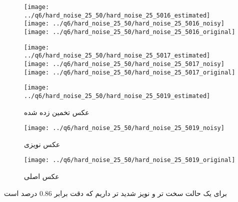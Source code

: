 \documentclass[a4paper,12pt]{article}
\begin{document}
\begin{figure}[!htb]
  \texttt{[image: ../q6/hard\_noise\_25\_50/hard\_noise\_25\_5016\_estimated]}
\endminipage\hfill
{}
  \texttt{[image: ../q6/hard\_noise\_25\_50/hard\_noise\_25\_5016\_noisy]}
\endminipage\hfill
{}
  \texttt{[image: ../q6/hard\_noise\_25\_50/hard\_noise\_25\_5016\_original]}
\endminipage\hfill

  \texttt{[image: ../q6/hard\_noise\_25\_50/hard\_noise\_25\_5017\_estimated]}
\endminipage\hfill
{}
  \texttt{[image: ../q6/hard\_noise\_25\_50/hard\_noise\_25\_5017\_noisy]}
\endminipage\hfill
{}
  \texttt{[image: ../q6/hard\_noise\_25\_50/hard\_noise\_25\_5017\_original]}
\endminipage\hfill

  \texttt{[image: ../q6/hard\_noise\_25\_50/hard\_noise\_25\_5019\_estimated]}
  \caption{  عکس تخمین زده شده }
\endminipage\hfill
{}
  \texttt{[image: ../q6/hard\_noise\_25\_50/hard\_noise\_25\_5019\_noisy]}
  \caption{  عکس نویزی }
\endminipage\hfill
{}
  \texttt{[image: ../q6/hard\_noise\_25\_50/hard\_noise\_25\_5019\_original]}
  \caption{  عکس اصلی }
\endminipage\hfill
\end{figure}



برای یک حالت سخت تر و نویز شدید تر داریم که دقت برابر 0.86 درصد است 
\end{document}
